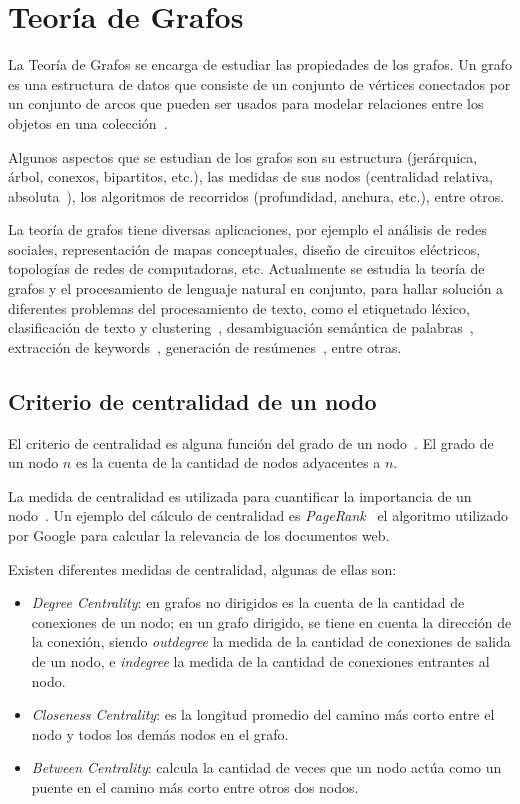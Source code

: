 \section{Teoría de Grafos}
La Teoría de Grafos se encarga de estudiar las propiedades de los grafos. Un grafo es una estructura de datos que consiste de un conjunto de vértices conectados por un conjunto de arcos que pueden ser usados para modelar relaciones entre los objetos en una colección~\cite{mihalcea2011graph}.

Algunos aspectos que se estudian de los grafos son su estructura (jerárquica, árbol, conexos, bipartitos, etc.), las medidas de sus nodos (centralidad relativa, absoluta~\cite{freeman1978centrality}), los algoritmos de recorridos (profundidad, anchura, etc.), entre otros.

La teoría de grafos tiene diversas aplicaciones, por ejemplo el análisis de redes sociales, representación de mapas conceptuales, diseño de circuitos eléctricos, topologías de redes de computadoras, etc. Actualmente se estudia la teoría de grafos y el procesamiento de lenguaje natural en conjunto, para hallar solución a diferentes problemas del procesamiento de texto, como el etiquetado léxico, clasificación de texto y clustering~\cite{mihalcea2011graph}, desambiguación semántica de palabras~\cite{MihalceaSinhaDisambiguation}\cite{ArabJahromiDisambiguation}, extracción de keywords~\cite{Litvak:2008:GKE:1613172.1613178}\cite{beliga2015overview}, generación de resúmenes~\cite{plaza2011uso}, entre otras.

\subsection{Criterio de centralidad de un nodo}
El criterio de centralidad es alguna función del grado de un nodo~\cite{freeman1978centrality}. El grado de un nodo $n$ es la cuenta de la cantidad de nodos adyacentes a $n$. 

La medida de centralidad es utilizada para cuantificar la importancia de un nodo~\cite{2018transfer}. Un ejemplo del cálculo de centralidad es \emph{PageRank}~\cite{page1999pagerank} el algoritmo utilizado por Google para calcular la relevancia de los documentos web.

Existen diferentes medidas de centralidad, algunas de ellas son:
\begin{itemize}
    \item \emph{Degree Centrality}: en grafos no dirigidos es la cuenta de la cantidad de conexiones de un nodo; en un grafo dirigido, se tiene en cuenta la dirección de la conexión, siendo \emph{outdegree} la medida de la cantidad de conexiones de salida de un nodo, e \emph{indegree} la medida de la cantidad de conexiones entrantes al nodo. 
    \item \emph{Closeness Centrality}: es la longitud promedio del camino más corto entre el nodo y todos los demás nodos en el grafo.
    \item \emph{Between Centrality}: calcula la cantidad de veces que un nodo actúa como un puente en el camino más corto entre otros dos nodos.
\end{itemize}

